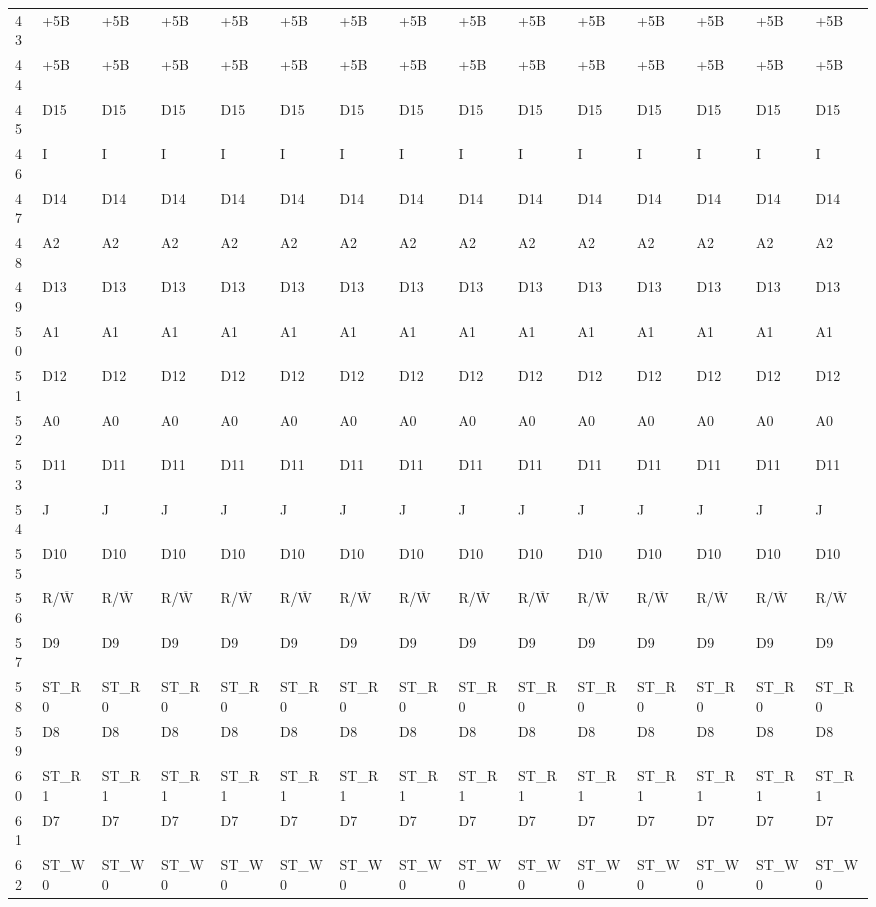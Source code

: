 \documentclass[hidelinks,11pt]{article}
\newcommand{\ol}[1]{$\overline{\mbox{#1}}$}
\begin{document}
\begin{tiny}
\begin{tabularx}{\textwidth}{|l|X|X|X|X|X|X|X|X|X|X|X|X|X|X|}
    43 & +5B & +5B & +5B & +5B & +5B & +5B & +5B & +5B & +5B & +5B & +5B & +5B & +5B & +5B \\
    44 & +5B & +5B & +5B & +5B & +5B & +5B & +5B & +5B & +5B & +5B & +5B & +5B & +5B & +5B \\
    45 & D15 & D15 & D15 & D15 & D15 & D15 & D15 & D15 & D15 & D15 & D15 & D15 & D15 & D15 \\
    46 & I & I & I & I & I & I & I & I & I & I & I & I & I & I \\
    47 & D14 & D14 & D14 & D14 & D14 & D14 & D14 & D14 & D14 & D14 & D14 & D14 & D14 & D14 \\
    48 & A2 & A2 & A2 & A2 & A2 & A2 & A2 & A2 & A2 & A2 & A2 & A2 & A2 & A2 \\
    49 & D13 & D13 & D13 & D13 & D13 & D13 & D13 & D13 & D13 & D13 & D13 & D13 & D13 & D13 \\
    50 & A1 & A1 & A1 & A1 & A1 & A1 & A1 & A1 & A1 & A1 & A1 & A1 & A1 & A1 \\
    51 & D12 & D12 & D12 & D12 & D12 & D12 & D12 & D12 & D12 & D12 & D12 & D12 & D12 & D12 \\
    52 & A0 & A0 & A0 & A0 & A0 & A0 & A0 & A0 & A0 & A0 & A0 & A0 & A0 & A0 \\
    53 & D11 & D11 & D11 & D11 & D11 & D11 & D11 & D11 & D11 & D11 & D11 & D11 & D11 & D11 \\
    54 & J & J & J & J & J & J & J & J & J & J & J & J & J & J \\
    55 & D10 & D10 & D10 & D10 & D10 & D10 & D10 & D10 & D10 & D10 & D10 & D10 & D10 & D10 \\
    56 & R/\ol{W} & R/\ol{W} & R/\ol{W} & R/\ol{W} & R/\ol{W} & R/\ol{W} & R/\ol{W} & R/\ol{W} & R/\ol{W} & R/\ol{W} & R/\ol{W} & R/\ol{W} & R/\ol{W} & R/\ol{W} \\
    57 & D9 & D9 & D9 & D9 & D9 & D9 & D9 & D9 & D9 & D9 & D9 & D9 & D9 & D9 \\
    58 & ST\_R0 & ST\_R0 & ST\_R0 & ST\_R0 & ST\_R0 & ST\_R0 & ST\_R0 & ST\_R0 & ST\_R0 & ST\_R0 & ST\_R0 & ST\_R0 & ST\_R0 & ST\_R0 \\
    59 & D8 & D8 & D8 & D8 & D8 & D8 & D8 & D8 & D8 & D8 & D8 & D8 & D8 & D8 \\
    60 & ST\_R1 & ST\_R1 & ST\_R1 & ST\_R1 & ST\_R1 & ST\_R1 & ST\_R1 & ST\_R1 & ST\_R1 & ST\_R1 & ST\_R1 & ST\_R1 & ST\_R1 & ST\_R1 \\
    61 & D7 & D7 & D7 & D7 & D7 & D7 & D7 & D7 & D7 & D7 & D7 & D7 & D7 & D7 \\
    62 & ST\_W0 & ST\_W0 & ST\_W0 & ST\_W0 & ST\_W0 & ST\_W0 & ST\_W0 & ST\_W0 & ST\_W0 & ST\_W0 & ST\_W0 & ST\_W0 & ST\_W0 & ST\_W0 \\

\end{tabularx}
\end{tiny}
\end{document}

